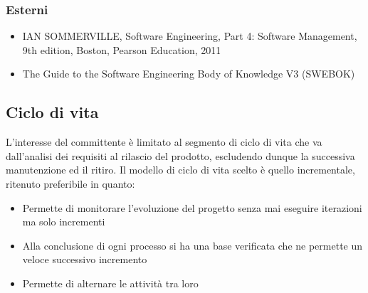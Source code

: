 \subsubsection{Esterni}
\begin{itemize}
\item IAN SOMMERVILLE, Software Engineering, Part 4: Software Management, 9th edition, Boston, Pearson Education, 2011
\item The Guide to the Software Engineering Body of Knowledge V3 (SWEBOK)
\end{itemize}

\subsection{Ciclo di vita}
L’interesse del committente è limitato al segmento di ciclo di vita che va dall’analisi dei requisiti al
rilascio del prodotto, escludendo dunque la successiva manutenzione ed il ritiro. Il modello di ciclo di
vita scelto è quello incrementale, ritenuto preferibile in quanto:
\begin{itemize}
\item Permette di monitorare l'evoluzione del progetto senza mai eseguire iterazioni ma solo incrementi
\item Alla conclusione di ogni processo si ha una base verificata che ne permette un veloce successivo incremento
\item Permette di alternare le attività tra loro
\end{itemize}
